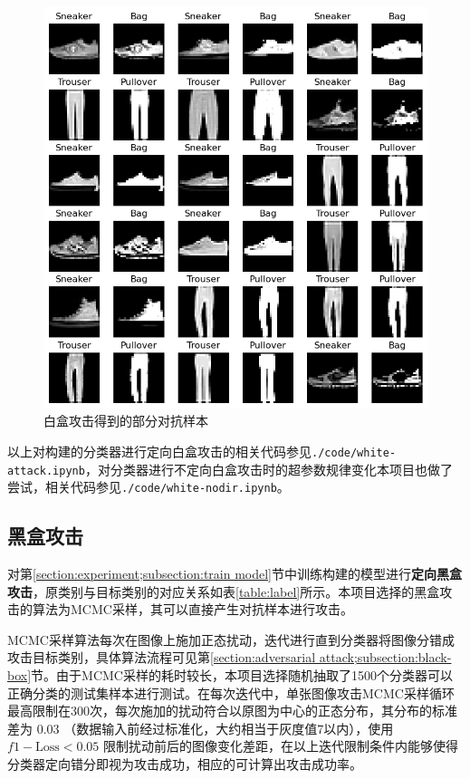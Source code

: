 \documentclass[journal, a4paper]{IEEEtran}
\begin{document}
\begin{figure}[t] 
    \centering
        \includegraphics[width=\columnwidth]{../img/white-attack-sample1.png}
    \caption{白盒攻击得到的部分对抗样本}\label{figure:White-Attack-Sample}
\end{figure}

以上对构建的分类器进行定向白盒攻击的相关代码参见\verb|./code/white-attack.ipynb|，对分类器进行不定向白盒攻击时的超参数规律变化本项目也做了尝试，相关代码参见\verb|./code/white-nodir.ipynb|。

\subsection{黑盒攻击}
\label{section:requirement;subsection:black-box attack}

对第\ref{section:experiment;subsection:train model}节中训练构建的模型进行\textbf{定向黑盒攻击}，原类别与目标类别的对应关系如表\ref{table:label}所示。本项目选择的黑盒攻击的算法为MCMC采样，其可以直接产生对抗样本进行攻击。

MCMC采样算法每次在图像上施加正态扰动，迭代进行直到分类器将图像分错成攻击目标类别，具体算法流程可见第\ref{section:adversarial attack;subsection:black-box}节。由于MCMC采样的耗时较长，本项目选择随机抽取了1500个分类器可以正确分类的测试集样本进行测试。在每次迭代中，单张图像攻击MCMC采样循环最高限制在300次，每次施加的扰动符合以原图为中心的正态分布，其分布的标准差为 $0.03$ （数据输入前经过标准化，大约相当于灰度值7以内），使用 $f1-\mathrm{Loss}<0.05$ 限制扰动前后的图像变化差距，在以上迭代限制条件内能够使得分类器定向错分即视为攻击成功，相应的可计算出攻击成功率。
\end{document}
